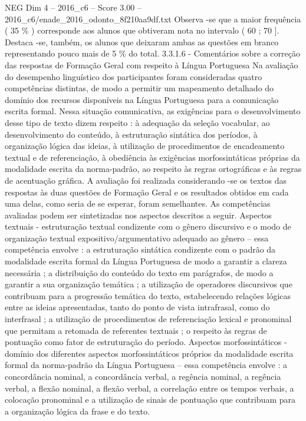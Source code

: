 \begin{textsample}{NEG Dim 4 – 2016\_c6 – Score 3.00 – 2016\_c6/enade\_2016\_odonto\_8f210aa9df.txt}
Observa -se que a maior frequência ( 35 \% ) corresponde aos alunos que obtiveram nota no intervalo ( 60 ; 70 ].
Destaca -se, também, os alunos que deixaram ambas as questões em branco representando pouco mais de 5 \% do total. 3.3.1.6 - Comentários sobre a correção das respostas de Formação Geral com respeito à Língua Portuguesa Na avaliação do desempenho linguístico dos participantes foram consideradas quatro competências distintas, de modo a permitir um mapeamento detalhado do domínio dos recursos disponíveis na Língua Portuguesa para a comunicação escrita formal.
Nessa situação comunicativa, as exigências para o desenvolvimento desse tipo de texto dizem respeito : à adequação da seleção vocabular, ao desenvolvimento do conteúdo, à estruturação sintática dos períodos, à organização lógica das ideias, à utilização de procedimentos de encadeamento textual e de referenciação, à obediência às exigências morfossintáticas próprias da modalidade escrita da norma-padrão, ao respeito às regras ortográficas e às regras de acentuação gráfica.
A avaliação foi realizada considerando -se os textos das respostas às duas questões de Formação Geral e os resultados obtidos em cada uma delas, como seria de se esperar, foram semelhantes.
As competências avaliadas podem ser sintetizadas nos aspectos descritos a seguir.
Aspectos textuais - estruturação textual condizente com o gênero discursivo e o modo de organização textual expositivo/argumentativo adequado ao gênero – essa competência envolve : a estruturação sintática condizente com o padrão da modalidade escrita formal da Língua Portuguesa de modo a garantir a clareza necessária ; a distribuição do conteúdo do texto em parágrafos, de modo a garantir a sua organização temática ; a utilização de operadores discursivos que contribuam para a progressão temática do texto, estabelecendo relações lógicas entre as ideias apresentadas, tanto do ponto de vista intrafrasal, como do interfrasal ; a utilização de procedimentos de referenciação lexical e pronominal que permitam a retomada de referentes textuais ; o respeito às regras de pontuação como fator de estruturação do período.
Aspectos morfossintáticos - domínio dos diferentes aspectos morfossintáticos próprios da modalidade escrita formal da norma-padrão da Língua Portuguesa – essa competência envolve : a concordância nominal, a concordância verbal, a regência nominal, a regência verbal, a flexão nominal, a flexão verbal, a correlação entre os tempos verbais, a colocação pronominal e a utilização de sinais de pontuação que contribuam para a organização lógica da frase e do texto.

\end{textsample}
